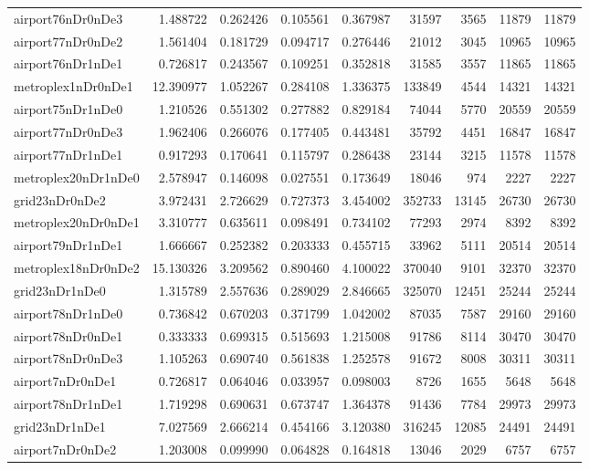 \begin{longtable}{|l|r|r|r|r|r|r|r|r|}
airport76nDr0nDe3 & 1.488722 & 0.262426 & 0.105561 & 0.367987 & 31597 & 3565 & 11879 & 11879 \\
airport77nDr0nDe2 & 1.561404 & 0.181729 & 0.094717 & 0.276446 & 21012 & 3045 & 10965 & 10965 \\
airport76nDr1nDe1 & 0.726817 & 0.243567 & 0.109251 & 0.352818 & 31585 & 3557 & 11865 & 11865 \\
metroplex1nDr0nDe1 & 12.390977 & 1.052267 & 0.284108 & 1.336375 & 133849 & 4544 & 14321 & 14321 \\
airport75nDr1nDe0 & 1.210526 & 0.551302 & 0.277882 & 0.829184 & 74044 & 5770 & 20559 & 20559 \\
airport77nDr0nDe3 & 1.962406 & 0.266076 & 0.177405 & 0.443481 & 35792 & 4451 & 16847 & 16847 \\
airport77nDr1nDe1 & 0.917293 & 0.170641 & 0.115797 & 0.286438 & 23144 & 3215 & 11578 & 11578 \\
metroplex20nDr1nDe0 & 2.578947 & 0.146098 & 0.027551 & 0.173649 & 18046 & 974 & 2227 & 2227 \\
grid23nDr0nDe2 & 3.972431 & 2.726629 & 0.727373 & 3.454002 & 352733 & 13145 & 26730 & 26730 \\
metroplex20nDr0nDe1 & 3.310777 & 0.635611 & 0.098491 & 0.734102 & 77293 & 2974 & 8392 & 8392 \\
airport79nDr1nDe1 & 1.666667 & 0.252382 & 0.203333 & 0.455715 & 33962 & 5111 & 20514 & 20514 \\
metroplex18nDr0nDe2 & 15.130326 & 3.209562 & 0.890460 & 4.100022 & 370040 & 9101 & 32370 & 32370 \\
grid23nDr1nDe0 & 1.315789 & 2.557636 & 0.289029 & 2.846665 & 325070 & 12451 & 25244 & 25244 \\
airport78nDr1nDe0 & 0.736842 & 0.670203 & 0.371799 & 1.042002 & 87035 & 7587 & 29160 & 29160 \\
airport78nDr0nDe1 & 0.333333 & 0.699315 & 0.515693 & 1.215008 & 91786 & 8114 & 30470 & 30470 \\
airport78nDr0nDe3 & 1.105263 & 0.690740 & 0.561838 & 1.252578 & 91672 & 8008 & 30311 & 30311 \\
airport7nDr0nDe1 & 0.726817 & 0.064046 & 0.033957 & 0.098003 & 8726 & 1655 & 5648 & 5648 \\
airport78nDr1nDe1 & 1.719298 & 0.690631 & 0.673747 & 1.364378 & 91436 & 7784 & 29973 & 29973 \\
grid23nDr1nDe1 & 7.027569 & 2.666214 & 0.454166 & 3.120380 & 316245 & 12085 & 24491 & 24491 \\
airport7nDr0nDe2 & 1.203008 & 0.099990 & 0.064828 & 0.164818 & 13046 & 2029 & 6757 & 6757 \\

\end{longtable}
